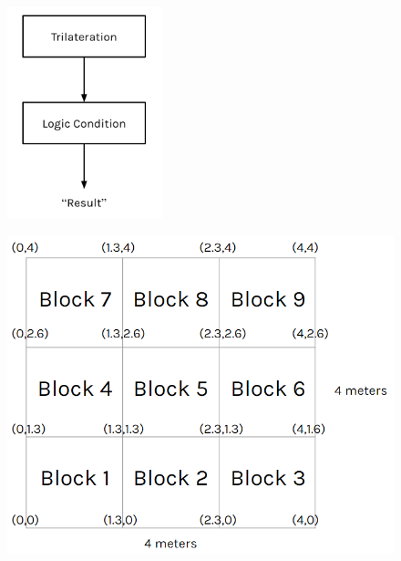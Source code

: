 \begin{figure}[h]
\centering
\includegraphics[width={0.4\textwidth}]{Image/diagram_logic2.png}
\caption{}
\label{diagram_logic}
\end{figure}

\begin{figure}[h]
\centering
\includegraphics[width={\textwidth}]{Image/blog33.png}
\caption{}
\label{logicalgo}
\end{figure}



